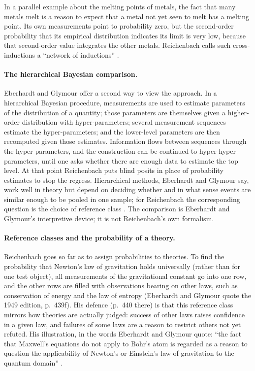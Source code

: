 In a parallel example about the melting points of metals, the fact that
many metals melt is a reason to expect that a metal not yet seen to melt
has a melting point. Its own measurements point to probability zero, but
the second-order probability that its empirical distribution indicates
its limit is very low, because that second-order value integrates the
other metals. Reichenbach calls such cross-inductions a ``network of
inductions'' \cite[p.~367]{EberhardtGlymour2011ReichenbachReading}.

\paragraph{The hierarchical Bayesian comparison.} Eberhardt and Glymour offer a
second way to view the approach. In a hierarchical Bayesian procedure,
measurements are used to estimate parameters of the distribution of a
quantity; those parameters are themselves given a higher-order
distribution with hyper-parameters; several measurement sequences
estimate the hyper-parameters; and the lower-level parameters are then
recomputed given those estimates. Information flows between sequences
through the hyper-parameters, and the construction can be continued to
hyper-hyper-parameters, until one asks whether there are enough data to
estimate the top level. At that point Reichenbach puts blind posits in
place of probability estimates to stop the regress. Hierarchical
methods, Eberhardt and Glymour say, work well in theory but depend on deciding
whether and in what sense events are similar enough to be pooled in one
sample; for Reichenbach the corresponding question is the choice of
reference class \cite[p.~367]{EberhardtGlymour2011ReichenbachReading}.
The comparison is Eberhardt and Glymour's interpretive device; it is not
Reichenbach's own formalism.

\paragraph{Reference classes and the probability of a theory.}
Reichenbach goes so far as to assign probabilities to theories. To find
the probability that Newton's law of gravitation holds universally
(rather than for one test object), all measurements of the gravitational
constant go into one row, and the other rows are filled with
observations bearing on other laws, such as conservation of energy and
the law of entropy (Eberhardt and Glymour quote the 1949 edition, p.~439f). His
defence (p.~440 there) is that this reference class mirrors how
theories are actually judged: success of other laws raises confidence in
a given law, and failures of some laws are a reason to restrict others
not yet refuted. His illustration, in the words Eberhardt and Glymour quote:
\enquote{the fact that Maxwell's equations do not apply to Bohr's atom
is regarded as a reason to question the applicability of Newton's or
Einstein's law of gravitation to the quantum domain}
\cite[pp.~367--368]{EberhardtGlymour2011ReichenbachReading}.

